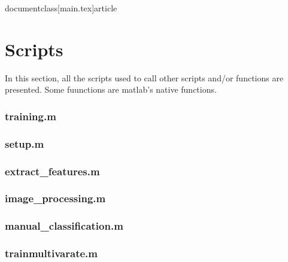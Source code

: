documentclass[main.tex]{article}


\newpage
\appendix \label{appendix}

\section{Scripts}
In this section, all the scripts used to call other scripts and/or functions are presented. Some fuunctions are matlab's native functions.

\subsubsection*{\hypertarget{training}{training.m}}


\subsubsection*{\hypertarget{setup}{setup.m}}


\subsubsection*{\hypertarget{extractfeat}{extract\_features.m}}


\subsubsection*{\hypertarget{imageprocessing}{image\_processing.m}}


\subsubsection*{\hypertarget{manclf}{manual\_classification.m}}


\subsubsection*{\hypertarget{trainclf}{trainmultivarate.m}}


